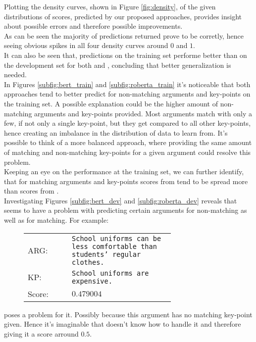 Plotting the density curves, shown in Figure \ref{fig:density}, of the given distributions of scores, predicted by our proposed approaches, provides 
insight about possible errors and therefore possible improvements.\\
As can be seen the majority of predictions returned prove to be corretly, hence seeing obvious spikes in all four density
curves around $0$ and $1$.\\
It can also be seen that, predictions on the training set performe better than on the development set for both 
\Roberta and \Bert, concluding that better generalization is needed.\\
In Figures \ref{subfig:bert_train} and \ref{subfig:roberta_train} it's noticeable that
both approaches tend to better predict for non-matching arguments and key-points on the training set. A possible explanation 
could be the higher amount of non-matching arguments and key-points provided. Most arguments match with only a few, if 
not only a single key-point, but they get compared to all other key-points, hence creating an imbalance in the distribution 
of data to learn from. It's possible to think of a more balanced approach, where providing the same amount of matching and 
non-matching key-points for a given argument could resolve this problem.\\
Keeping an eye on the performance at the training set, we can further identify, that for matching arguments and key-points 
scores from \Bert tend to be spread more than scores from \Roberta.\\

Investigating Figures \ref{subfig:bert_dev} and \ref{subfig:roberta_dev} reveals that \Bert seems to have a problem with 
predicting certain arguments for non-matching as well as for matching. For example: \\

\begin{figure}[H]
    \begin{tabularx}{\linewidth}{lp{0.7\linewidth}}
            ARG: & \texttt{School uniforms can be less comfortable than students' regular clothes.}\\
            KP: & \texttt{School uniforms are expensive.}\\
            Score:& $0.479004$\\
    \end{tabularx}
\end{figure}

poses a problem for it. Possibly because this argument has no matching key-point given. Hence it's imaginable that 
\Bert doesn't know how to handle it and therefore giving it a score arround $0.5$.\\

